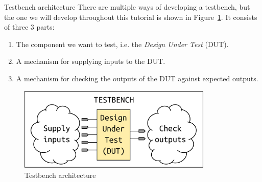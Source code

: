 \documentclass[lab]{course}
\begin{document}
\clearpage

\begin{section}{Testbench architecture}
    There are multiple ways of developing a testbench, but the one we will develop throughout this tutorial is shown in Figure~\ref{fig:testbench_architecture}. It consists of three 3 parts:

    \begin{enumerate}
        \item The component we want to test, i.e. the \emph{Design Under Test} (DUT).
        \item A mechanism for supplying inputs to the DUT.
        \item A mechanism for checking the outputs of the DUT against expected outputs.
    \end{enumerate}

    \begin{figure}[!h]
        \begin{centering}
            \includegraphics[width=0.825\textwidth]{figs/testbench_architecture.pdf}
            \caption{Testbench architecture}
            \label{fig:testbench_architecture}
        \end{centering}
    \end{figure}
\end{section}
\end{document}
